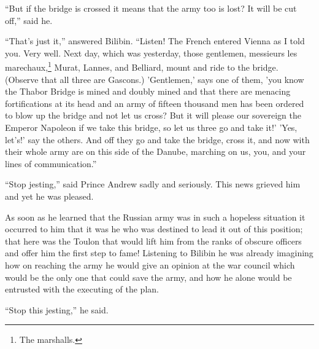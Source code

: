 ``But if the bridge is crossed it means that the army too is
lost? It will be cut off,'' said he.

``That's just it,'' answered Bilibin. ``Listen! The French
entered Vienna as I told you. Very well. Next day, which was
yesterday, those gentlemen, messieurs les marechaux,\footnote{The
marshalls.}  Murat, Lannes, and Belliard, mount and ride to the
bridge. (Observe that all three are Gascons.)  'Gentlemen,' says
one of them, 'you know the Thabor Bridge is mined and doubly
mined and that there are menacing fortifications at its head and
an army of fifteen thousand men has been ordered to blow up the
bridge and not let us cross? But it will please our sovereign the
Emperor Napoleon if we take this bridge, so let us three go and
take it!' 'Yes, let's!' say the others. And off they go and take
the bridge, cross it, and now with their whole army are on this
side of the Danube, marching on us, you, and your lines of
communication.''

``Stop jesting,'' said Prince Andrew sadly and seriously. This
news grieved him and yet he was pleased.

As soon as he learned that the Russian army was in such a
hopeless situation it occurred to him that it was he who was
destined to lead it out of this position; that here was the
Toulon that would lift him from the ranks of obscure officers and
offer him the first step to fame!  Listening to Bilibin he was
already imagining how on reaching the army he would give an
opinion at the war council which would be the only one that could
save the army, and how he alone would be entrusted with the
executing of the plan.

``Stop this jesting,'' he said.

